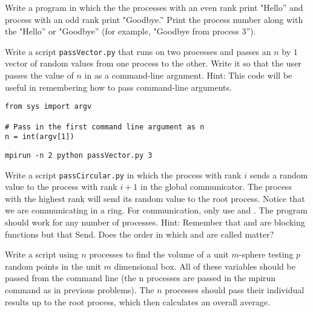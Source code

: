 
Write a program in which the the processes with an even rank print "Hello'' and process with an odd rank print "Goodbye.'' 
Print the process number along with the "Hello'' or "Goodbye'' 
(for example, "Goodbye from process 3'').

Write a script \texttt{passVector.py} that runs on two processes and passes an $n$ by $1$ vector of random values from one process to the other. 
Write it so that the user passes the value of $n$ in as a command-line argument.
Hint: This code will be useful in remembering how to pass command-line arguments.
\begin{lstlisting}
from sys import argv

# Pass in the first command line argument as n
n = int(argv[1])
\end{lstlisting}
\begin{lstlisting}
mpirun -n 2 python passVector.py 3
\end{lstlisting}

Write a script \texttt{passCircular.py} in which the process with rank $i$ sends a random value to the process with rank $i+1$ in the global communicator. 
The process with the highest rank will send its random value to the root process. 
Notice that we are communicating in a ring. 
For communication, only use  and . 
The program should work for any number of processes. 
Hint: Remember that  and  are blocking functions but that Send. 
Does the order in which  and  are called matter?

Write a script using $n$ processes to find the volume of a unit $m$-sphere testing $p$ random points in the unit $m$ dimensional box. 
All of these variables should be passed from the command line (the n processes are passed in the mpirun command as in previous problems). 
The $n$ processes should pass their individual results up to the root process, which then calculates an overall average. 
